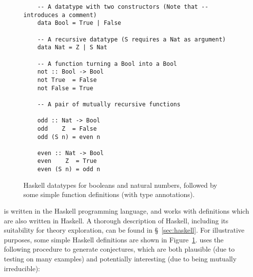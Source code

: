 \begin{figure}
  \centering
  \begin{verbatim}
    -- A datatype with two constructors (Note that -- introduces a comment)
    data Bool = True | False

    -- A recursive datatype (S requires a Nat as argument)
    data Nat = Z | S Nat

    -- A function turning a Bool into a Bool
    not :: Bool -> Bool
    not True  = False
    not False = True

    -- A pair of mutually recursive functions

    odd :: Nat -> Bool
    odd    Z  = False
    odd (S n) = even n

    even :: Nat -> Bool
    even    Z  = True
    even (S n) = odd n
  \end{verbatim}
  \caption{Haskell datatypes for booleans and natural numbers, followed by some
    simple function definitions (with type annotations).}
  \label{fig:haskellteexample}
\end{figure}

\quickspec{} is written in the Haskell programming language, and works with
definitions which are also written in Haskell. A thorough description of
Haskell, including its suitability for theory exploration, can be found in
\S~\ref{sec:haskell}. For illustrative purposes, some simple Haskell definitions
are shown in Figure~\ref{fig:haskellteexample}. \quickspec{} uses the following
procedure to generate conjectures, which are both plausible (due to testing on
many examples) and potentially interesting (due to being mutually irreducible):

